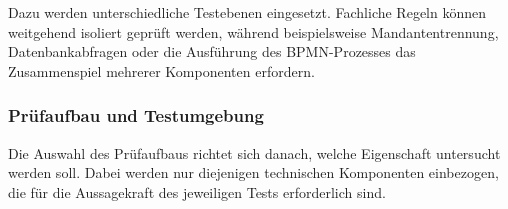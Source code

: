 Dazu werden unterschiedliche Testebenen eingesetzt. Fachliche Regeln können
weitgehend isoliert geprüft werden, während beispielsweise Mandantentrennung,
Datenbankabfragen oder die Ausführung des BPMN-Prozesses das Zusammenspiel
mehrerer Komponenten erfordern.

\subsubsection{Prüfaufbau und Testumgebung}
\label{sec:teststrategie-anforderungsbezug-testumgebung}

Die Auswahl des Prüfaufbaus richtet sich danach, welche Eigenschaft untersucht
werden soll. Dabei werden nur diejenigen technischen Komponenten einbezogen,
die für die Aussagekraft des jeweiligen Tests erforderlich sind.

